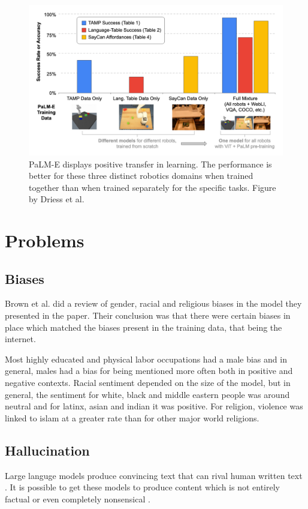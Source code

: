 \documentclass[twoside]{article}
\begin{document}
\begin{figure}[h]
  \centering
  \includegraphics*[scale=0.1]{img/palm-e-transfer.png}
  \caption{
    PaLM-E displays positive transfer in learning. The performance is better for these three
    distinct robotics domains when trained together than when trained separately for the 
    specific tasks. Figure by Driess et al. \cite{driess_palm-e_2023}
  }
\end{figure}


\section{Problems}
\subsection{Biases}
Brown et al. \cite{brown_language_2020} did a review of gender, racial and religious
biases in the model they presented in the paper. Their conclusion was that there were
certain biases in place which matched the biases present in the training data, that being
the internet. 

Most highly educated and physical labor occupations had a male bias and in general, males
had a bias for being mentioned more often both in positive and negative contexts. Racial
sentiment depended on the size of the model, but in general, the sentiment for white,
black and middle eastern people was around neutral and for latinx, asian and indian it was
positive. For religion, violence was linked to islam at a greater rate than for other
major world religions.

\subsection{Hallucination}
Large languge models produce convincing text that can rival human written text \cite{brown_language_2020}.
It is possible to get these models to produce content which is 
not entirely factual or even completely nonsensical \cite{ji_survey_2023}. 
\end{document}

